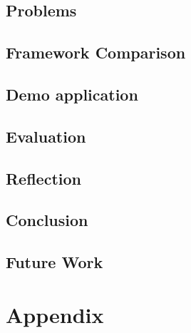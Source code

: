 \chapter{Problems}




\chapter{Framework Comparison}


\chapter{Demo application}


\chapter{Evaluation}




\chapter{Reflection}


\chapter{Conclusion}


\chapter{Future Work}


\printbibliography

\part{Appendix}
\appendix


